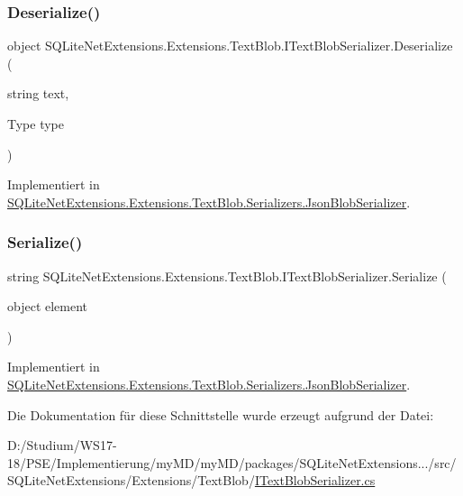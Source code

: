 \subsubsection{\texorpdfstring{Deserialize()}{Deserialize()}}
{\footnotesize\ttfamily object S\+Q\+Lite\+Net\+Extensions.\+Extensions.\+Text\+Blob.\+I\+Text\+Blob\+Serializer.\+Deserialize (\begin{DoxyParamCaption}\item[{string}]{text,  }\item[{Type}]{type }\end{DoxyParamCaption})}



Implementiert in \mbox{\hyperlink{class_s_q_lite_net_extensions_1_1_extensions_1_1_text_blob_1_1_serializers_1_1_json_blob_serializer_a9d0b3ea894c5a047b15bff731c25c82f}{S\+Q\+Lite\+Net\+Extensions.\+Extensions.\+Text\+Blob.\+Serializers.\+Json\+Blob\+Serializer}}.

\mbox{\label{interface_s_q_lite_net_extensions_1_1_extensions_1_1_text_blob_1_1_i_text_blob_serializer_a3e0a51dfda28489d8ad53c2e9ee8ed57}} 
\subsubsection{\texorpdfstring{Serialize()}{Serialize()}}
{\footnotesize\ttfamily string S\+Q\+Lite\+Net\+Extensions.\+Extensions.\+Text\+Blob.\+I\+Text\+Blob\+Serializer.\+Serialize (\begin{DoxyParamCaption}\item[{object}]{element }\end{DoxyParamCaption})}



Implementiert in \mbox{\hyperlink{class_s_q_lite_net_extensions_1_1_extensions_1_1_text_blob_1_1_serializers_1_1_json_blob_serializer_ab8efea2b436de4940db88ec2f224b85f}{S\+Q\+Lite\+Net\+Extensions.\+Extensions.\+Text\+Blob.\+Serializers.\+Json\+Blob\+Serializer}}.



Die Dokumentation für diese Schnittstelle wurde erzeugt aufgrund der Datei\+:\begin{DoxyCompactItemize}
\item 
D\+:/\+Studium/\+W\+S17-\/18/\+P\+S\+E/\+Implementierung/my\+M\+D/my\+M\+D/packages/\+S\+Q\+Lite\+Net\+Extensions.../src/\+S\+Q\+Lite\+Net\+Extensions/\+Extensions/\+Text\+Blob/\mbox{\hyperlink{_i_text_blob_serializer_8cs}{I\+Text\+Blob\+Serializer.\+cs}}\end{DoxyCompactItemize}
